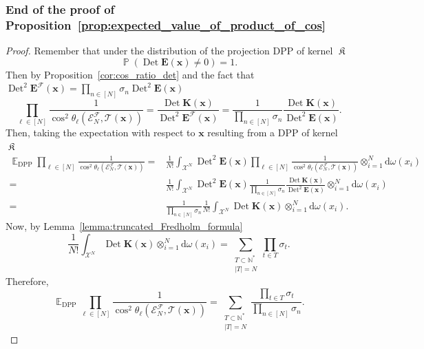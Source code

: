\documentclass[twoside,11pt]{book}
\numberwithin{theorem}{chapter}
\numberwithin{definition}{chapter}
\numberwithin{proposition}{chapter}
\numberwithin{corollary}{chapter}
\numberwithin{example}{chapter}
\numberwithin{lemma}{chapter}
\numberwithin{assumption}{chapter}
\numberwithin{equation}{chapter}
\numberwithin{figure}{chapter}
\DeclareMathOperator{\Det}{Det}
\DeclareMathOperator{\DPP}{\mathrm{DPP}}
\DeclareMathOperator{\EX}{\mathbb{E}}
\DeclareMathOperator{\Prb}{\mathbb{P}}
\DeclareMathOperator*{\KDPP}{\mathfrak{K}}
\begin{document}
\subsubsection{End of the proof of Proposition~\ref{prop:expected_value_of_product_of_cos}}
\begin{proof}
Remember that under the distribution of the projection DPP of kernel $\KDPP$ 
\begin{equation}
\Prb \left( \Det \bm{E}(\bm{x})  \neq 0 \right) = 1.
\end{equation}
Then by Proposition~\ref{cor:cos_ratio_det} and the fact that $\Det^{2} \bm{E}^{\mathcal{F}}(\bm{x}) = \prod\limits_{n \in [N]} \sigma_{n} \Det^{2} \bm{E}(\bm{x})$
\begin{equation}
\prod\limits_{\ell \in [N]} \frac{1}{\cos^{2} \theta_{\ell} \left(\mathcal{E}^{\mathcal{F}}_{N}, \mathcal{T}(\bm{x}) \right)} = \frac{\Det \bm{K}(\bm{x})}{\Det^{2} \bm{E}^{\mathcal{F}}(\bm{x})} = \frac{1}{\prod\limits_{n \in [N]} \sigma_{n}}\frac{\Det \bm{K}(\bm{x})}{\Det^{2} \bm{E}(\bm{x})}.
\end{equation}
Then, taking the expectation with respect to $\bm{x}$ resulting from a DPP of kernel $\KDPP$
\begin{align}
\EX_{\DPP} \prod\limits_{\ell \in [N]} \frac{1}{\cos^{2} \theta_{\ell}\left(\mathcal{E}^{\mathcal{F}}_{N}, \mathcal{T}(\bm{x}) \right)} = & \frac{1}{N!} \int_{\mathcal{X}^{N}} \Det^{2} \bm{E}(\bm{x}) \prod\limits_{\ell \in [N]} \frac{1}{\cos^{2} \theta_{\ell} \left(\mathcal{E}^{\mathcal{F}}_{N}, \mathcal{T}(\bm{x}) \right)} \otimes_{i =1}^{N} \mathrm{d}\omega(x_{i}) \\
 = & \frac{1}{N!} \int_{\mathcal{X}^{N}} \Det^{2} \bm{E}(\bm{x}) \frac{1}{\prod\limits_{n \in [N]} \sigma_{n}}\frac{\Det \bm{K}(\bm{x})}{\Det^{2} \bm{E}(\bm{x})} \otimes_{i =1}^{N} \mathrm{d}\omega(x_{i}) \nonumber\\
 = & \frac{1}{\prod\limits_{n \in [N]} \sigma_{n}} \frac{1}{N!} \int_{\mathcal{X}^{N}}\Det \bm{K}(\bm{x}) \otimes_{i =1}^{N} \mathrm{d}\omega(x_{i}) \nonumber.
\end{align}
Now, by Lemma~\ref{lemma:truncated_Fredholm_formula}
\begin{equation}
\frac{1}{N!} \int_{\mathcal{X}^{N}}\Det \bm{K}(\bm{x}) \otimes_{i =1}^{N} \mathrm{d}\omega(x_{i})  = \sum\limits_{\substack{T \subset \mathbb{N}^{*} \\ |T| = N}}  \prod\limits_{t \in T}\sigma_{t}.
\end{equation}
Therefore,
\begin{equation}
\EX_{\DPP} \prod\limits_{\ell \in [N]} \frac{1}{\cos^{2} \theta_{\ell}\left(\mathcal{E}^{\mathcal{F}}_{N}, \mathcal{T}(\bm{x}) \right)}  =  \sum\limits_{\substack{T \subset \mathbb{N}^{*} \\ |T| = N}} \frac{ \prod\limits_{t \in T}\sigma_{t}}{\prod\limits_{n \in [N]} \sigma_{n}}.
\end{equation}

\end{proof}
\end{document}
